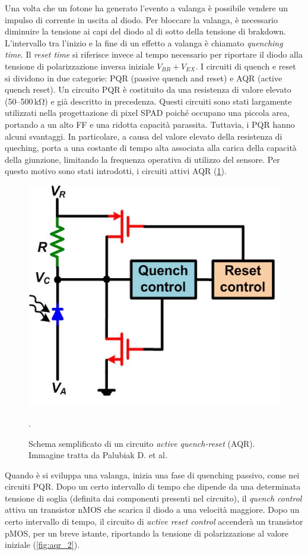 Una volta che un fotone ha generato l'evento a valanga è possibile vendere un impulso di corrente in uscita al diodo. Per bloccare la valanga, è necessario diminuire la tensione ai capi del diodo al di sotto della tensione di brakdown. L'intervallo tra l'inizio e la fine di un effetto a valanga è chiamato \textit{quenching time}. Il \textit{reset time} si riferisce invece al tempo necessario per riportare il diodo alla tensione di polarizzazione inversa iniziale $V_{BR}+V_{EX}$. I circuiti di quench e reset si dividono in due categorie: PQR (passive quench and reset) e AQR (active quench reset). Un circuito PQR è costituito da una resistenza di valore elevato (\numrange[range-phrase=--]{50}{500}\,\unit{\kilo\ohm}) e già descritto in precedenza. Questi circuiti sono stati largamente utilizzati nella progettazione di pixel SPAD poiché occupano una piccola area, portando a un alto FF e una ridotta capacità parassita. Tuttavia, i PQR hanno alcuni svantaggi. In particolare, a causa del valore elevato della resistenza di queching, porta a una costante di tempo alta associata alla carica della capacità della giunzione, limitando la frequenza operativa di utilizzo del sensore. Per questo motivo sono stati introdotti, i circuiti attivi AQR (\Fig\ref{fig:aqr}).
\begin{figure}[tbh]
	\centering
	\includegraphics[width=0.6\linewidth]{./ImageFiles/aqr.jpg}
	\caption{Schema semplificato di un circuito \textit{active quench-reset} (AQR). Immagine tratta da Palubiak D. et al. \cite{Palubiak2011}}. 
	\label{fig:aqr}
\end{figure} 
Quando è si sviluppa una valanga, inizia una fase di quenching passivo, come nei circuiti PQR. Dopo un certo intervallo di tempo che dipende da una determinata tensione di soglia (definita dai componenti presenti nel circuito), il \textit{quench control} attiva un transistor nMOS che scarica il diodo a una velocità maggiore. Dopo un certo intervallo di tempo, il circuito di \textit{active reset control} accenderà un transistor pMOS, per un breve istante, riportando la tensione di polarizzazione al valore iniziale (\Fig\ref{fig:aqr_2}).
